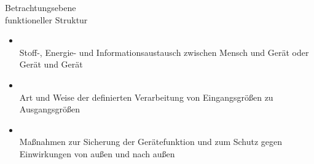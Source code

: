 
\begin{minipage}{.3\textwidth}
	Betrachtungsebene\\ funktioneller Struktur
	\begin{itemize}
		\item {}\\
			Stoff-, Energie- und Informationsaustausch zwischen Mensch und Gerät oder Gerät und Gerät
		\item {}\\
			Art und Weise der definierten Verarbeitung von Eingangsgrößen zu Ausgangsgrößen
		\item {}\\
			Maßnahmen zur Sicherung der Gerätefunktion und zum Schutz gegen Einwirkungen von außen und nach außen
	\end{itemize}
\end{minipage}
